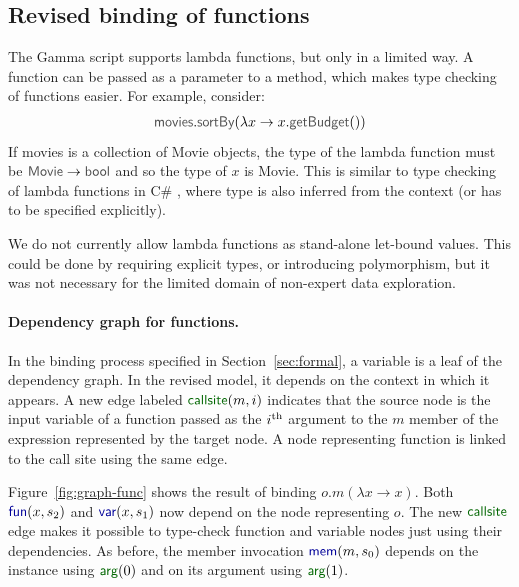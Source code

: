 \documentclass[acmsmall,anonymous,fleqn]{acmart}\settopmatter{printfolios=false,printccs=false,printacmref=false}
\theoremstyle{plain}
\theoremstyle{definition}
\newcommand{\ident}[1]{\textnormal{\textcolor{idclr}{\sffamily #1}}}
\newcommand{\bnd}[1]{\textnormal{\textcolor{kvdclr}{\sffamily #1}}}
\newcommand{\blbl}[1]{\textnormal{\textcolor{numclr}{\sffamily #1}}}
\begin{document}

\subsection{Revised binding of functions}
\label{sec:types-funs}

The Gamma script supports lambda functions, but only in a limited way. A function can be passed
as a parameter to a method, which makes type checking of functions easier. For example, consider:
%
\begin{equation*}
\begin{array}{l}
\ident{movies}.\ident{sortBy}(\lambda x \rightarrow x.\ident{getBudget}())
\end{array}
\end{equation*}
%
If \ident{movies} is a collection of \ident{Movie} objects, the type of the lambda function must be
$\ident{Movie}\rightarrow\ident{bool}$ and so the type of $x$ is \ident{Movie}. This is similar to
type checking of lambda functions in C\# \cite{csharp}, where type is also inferred from the context (or has
to be specified explicitly).

We do not currently allow lambda functions as stand-alone let-bound
values. This could be done by requiring explicit types, or introducing polymorphism, but it was not
necessary for the limited domain of non-expert data exploration.

\paragraph{Dependency graph for functions.}
In the binding process specified in Section~\ref{sec:formal}, a variable is a leaf of the dependency
graph. In the revised model, it depends on the context in which it appears. A new edge labeled
$\blbl{callsite}(m, i)$ indicates that the source node is the input variable of a function
passed as the $i^\textnormal{th}$ argument to the $m$ member of the expression represented by the
target node. A node representing function is linked to the call site using the same edge.

Figure~\ref{fig:graph-func} shows the result of binding $o.m(\lambda x\rightarrow x)$. Both
$\bnd{fun}(x, s_2)$ and $\bnd{var}(x, s_1)$ now depend on the node representing $o$. The new
$\blbl{callsite}$ edge makes it possible to type-check function and variable nodes just using their
dependencies. As before, the member invocation $\bnd{mem}(m, s_0)$
depends on the instance using $\blbl{arg}(0)$ and on its argument using $\blbl{arg}(1)$.
\end{document}
